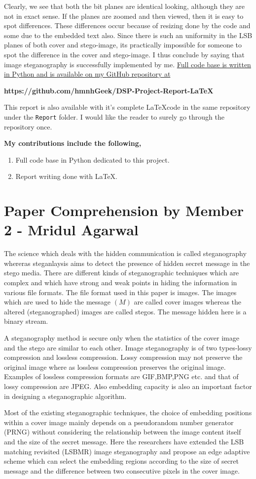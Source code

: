 \documentclass{report}
\begin{document}
Clearly, we see that both the bit planes are identical looking, although they are not in exact sense. If the planes are zoomed and then viewed, then it is easy to spot differences. These differences occur because of resizing done by the code and some due to the embedded text also. Since there is such an uniformity in the LSB planes of both cover and stego-image, its practically impossible for someone to spot the difference in the cover and stego-image. I thus conclude by saying that image steganography is successfully implemented by me. \underline{Full code base is written in Python and is  available on my GitHub repository at} \begin{center} {\bf https://github.com/hmnhGeek/DSP-Project-Report-LaTeX} \end{center}
This report is also available with it's complete \LaTeX code in the same repository under the \texttt{Report} folder. I would like the reader to surely go through the repository once.
\\
\par {\bf My contributions include the following,}
\begin{enumerate}
\item Full code base in Python dedicated to this project.
\item Report writing done with \LaTeX. 
\end{enumerate}

\section{Paper Comprehension by Member 2 - Mridul Agarwal}
The science which deals with the hidden communication is called steganography  whereras steganlaysis aims to detect the presence of hidden secret message in the stego media. There are different kinds of steganographic techniques which are complex and which have strong and weak points in hiding the information in various file formats. The file format used in this paper is images. The images which are used to hide the message $(M)$ are called cover images whereas the altered (steganographed) images are called stegos. The message hidden here is a binary stream. \par A steganography method is secure only when the statistics of the cover image and the stego are similar to each other. Image steganography is of two types-lossy compression and lossless compression. Lossy compression may not preserve the original image where as lossless compression preserves the original image. Examples of lossless compression formats are GIF,BMP,PNG etc. and that of lossy compression are JPEG. Also embedding capacity is also an important factor in designing a steganographic algorithm. \par Most of the existing steganographic techniques, the choice of embedding positions within a cover image mainly depends on a pseudorandom number generator (PRNG) without considering the relationship between the image content itself and the size of the secret message. Here the researchers have extended the LSB matching revisited (LSBMR) image steganography and propose an edge adaptive scheme which can select the embedding regions according to the size of secret message and the difference between two consecutive pixels in the cover image.
\end{document}
